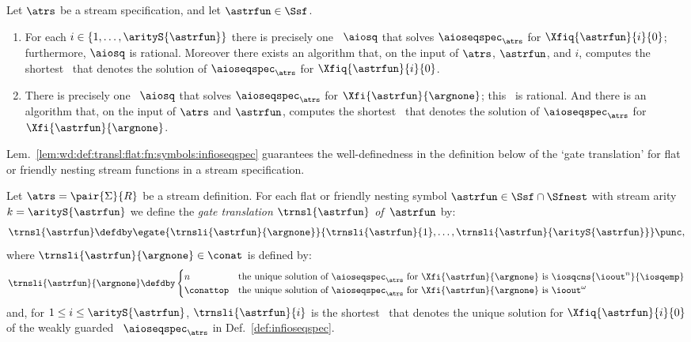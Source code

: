 \begin{lemma}\label{lem:wd:def:transl:flat:fn:symbols:infioseqspec}
Let $\atrs$ be a stream specification,
  and let $\astrfun\in\Ssf$.
\begin{enumerate}
\item For each $i\in\{1,\ldots,\arityS{\astrfun}\}$
       there is precisely one \ioseq~$\aiosq$ that solves
       $\aioseqspec_{\atrs}$ for $\Xfiq{\astrfun}{i}{0}$;
       furthermore, $\aiosq$ is rational.
       Moreover there exists an algorithm that,
       on the input of $\atrs$, $\astrfun$, and $i$,
       computes the shortest \ioterm\ that denotes the 
       solution of $\aioseqspec_{\atrs}$ for $\Xfiq{\astrfun}{i}{0}$.
\item There is precisely one \ioseq~$\aiosq$ that solves
       $\aioseqspec_{\atrs}$ for $\Xfi{\astrfun}{\argnone}$;
       this \ioseq\ is rational.
       And there is an algorithm that, 
       on the input of $\atrs$ and $\astrfun$,
       computes the shortest \ioterm\ that denotes the 
       solution of $\aioseqspec_{\atrs}$ 
       for $\Xfi{\astrfun}{\argnone}$.
\end{enumerate}
\end{lemma}


Lem.~\ref{lem:wd:def:transl:flat:fn:symbols:infioseqspec} guarantees 
the well-definedness in the definition below
of the `gate translation' for flat or friendly nesting stream functions 
in a stream specification. 

\begin{definition}\normalfont
  \label{def:transl:flat:fn:symbols:infioseqspec}
Let $\atrs = \pair{\Sigma}{R}$ be a stream definition. 
For each flat or friendly nesting symbol
  $\astrfun \in \Ssf \cap \Sfnest $ 
  with stream arity $k = \arityS{\astrfun}$ we define the \emph{gate translation $\trnsl{\astrfun}$ of\/~$\astrfun$} by:
\begin{equation*}
    \trnsl{\astrfun}
    \defdby
    \egate{\trnsli{\astrfun}{\argnone}}{
      \trnsli{\astrfun}{1},\ldots,\trnsli{\astrfun}{\arityS{\astrfun}}
    }
    \punc,
  \end{equation*}
where $\trnsli{\astrfun}{\argnone}\in\conat$ is defined by:
\begin{equation*}
\trnsli{\astrfun}{\argnone} \defdby
      \begin{cases}
n & \text{the unique solution of $\aioseqspec_{\atrs}$ 
              for $\Xfi{\astrfun}{\argnone}$ is $\iosqcns{\ioout^{n}}{\iosqemp}$}
        \\
        \conattop &
          \text{the unique solution of $\aioseqspec_{\atrs}$ 
              for $\Xfi{\astrfun}{\argnone}$ is $\ioout^{\omega}$}    
      
      \end{cases}
\end{equation*}
and, for $1\le i\le \arityS{\astrfun}$,
  $\trnsli{\astrfun}{i}$ is the shortest \ioterm\ that denotes
  the unique solution for $\Xfiq{\astrfun}{i}{0}$
  of the weakly guarded \infioseqspec~$\aioseqspec_{\atrs}$
  in Def.~\ref{def:infioseqspec}.
\end{definition}


